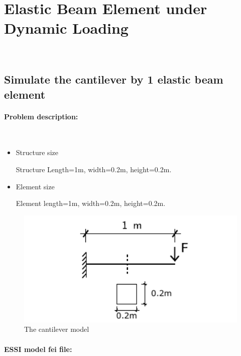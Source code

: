 \newpage
\section{Elastic Beam Element under Dynamic Loading} ~ 
\subsection{Simulate the cantilever by 1 elastic beam element} 
\paragraph{Problem description:} ~

\begin{itemize}
  \item Structure size

    Structure Length=1m, width=0.2m, height=0.2m.

  \item Element size

    Element length=1m, width=0.2m, height=0.2m.
\end{itemize}

\begin{figure}[!htb]
  \centering
  \includegraphics[width=12cm]{./Figure-files/_Chapter_Appendix_Illustrative_Examples/cantilever.pdf}
  \caption{The cantilever model}
  \label{fig-canti_1beam}
\end{figure}


\paragraph{ESSI model fei file: } ~

